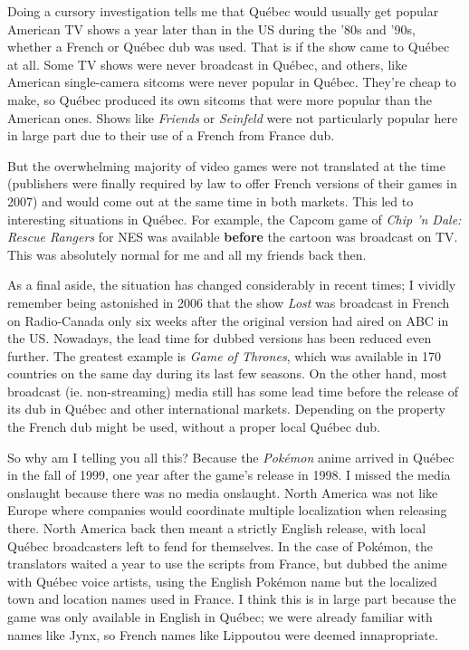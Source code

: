 \documentclass{book}
\begin{document}
Doing a cursory investigation tells me that Québec would usually get popular American TV shows a year later than in the US during the ’80s and ’90s, whether a French or Québec dub was used. That is if the show came to Québec at all. Some TV shows were never broadcast in Québec, and others, like American single-camera sitcoms were never popular in Québec. They’re cheap to make, so Québec produced its own sitcoms that were more popular than the American ones. Shows like \emph{Friends} or \emph{Seinfeld} were not particularly popular here in large part due to their use of a French from France dub.

But the overwhelming majority of video games were not translated at the time (publishers were finally required by law to offer French versions of their games in 2007) and would come out at the same time in both markets. This led to interesting situations in Québec. For example, the Capcom game of \emph{Chip ’n Dale: Rescue Rangers} for NES was available \textbf{before} the cartoon was broadcast on TV. This was absolutely normal for me and all my friends back then.

As a final aside, the situation has changed considerably in recent times; I vividly remember being astonished in 2006 that the show \emph{Lost} was broadcast in French on Radio-Canada only six weeks after the original version had aired on ABC in the US. Nowadays, the lead time for dubbed versions has been reduced even further. The greatest example is \emph{Game of Thrones}, which was available in 170 countries on the same day during its last few seasons. On the other hand, most broadcast (ie. non-streaming) media still has some lead time before the release of its dub in Québec and other international markets. Depending on the property the French dub might be used, without a proper local Québec dub.

So why am I telling you all this? Because the \emph{Pokémon} anime arrived in Québec in the fall of 1999, one year after the game’s release in 1998. I missed the media onslaught because there was no media onslaught. North America was not like Europe where companies would coordinate multiple localization when releasing there. North America back then meant a strictly English release, with local Québec broadcasters left to fend for themselves. In the case of Pokémon, the translators waited a year to use the scripts from France, but dubbed the anime with Québec voice artists, using the English Pokémon name but the localized town and location names used in France. I think this is in large part because the game was only available in English in Québec; we were already familiar with names like Jynx, so French names like Lippoutou were deemed innapropriate.
\end{document}
